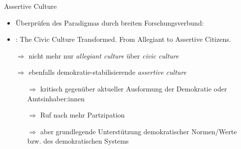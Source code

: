 \documentclass[11pt]{beamer}
\begin{document}
%
%
%
%


\begin{frame}[t]{Assertive Culture}
\begin{itemize}
	\item Überprüfen des Paradigmas durch breiten Forschungsverbund:
	\item \cite{Dalton2014b}: The Civic Culture Transformed. From Allegiant to Assertive Citizens. \pause
	\item[$\Rightarrow$] nicht mehr nur \textit{allegiant culture} über \textit{civic culture} \pause
	\item[$\Rightarrow$] ebenfalls demokratie-stabilisierende \textit{assertive culture} \pause
	\begin{itemize}
		\item[$\Rightarrow$] kritisch gegenüber aktueller Ausformung der Demokratie oder Amtsinhaber:innen 
		\item[$\Rightarrow$] Ruf nach mehr Partzipation
		\item[$\Rightarrow$] aber grundlegende Unterstützung demokratischer Normen/Werte bzw. des demokratischen Systems 
	\end{itemize}
\end{itemize}
\end{frame}
\end{document}
